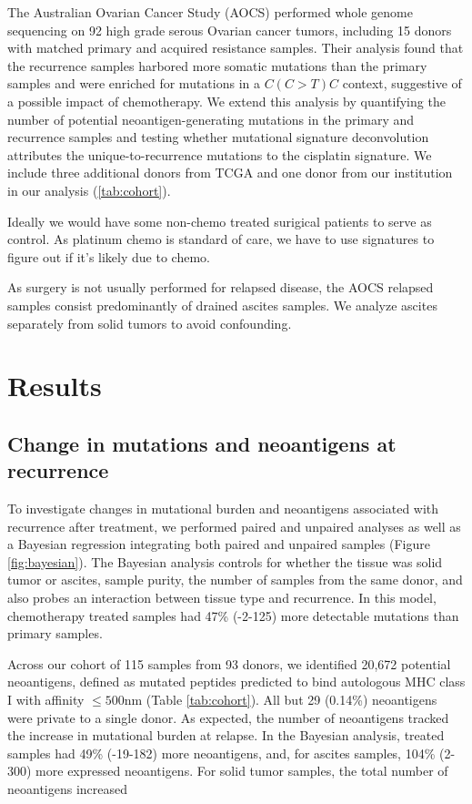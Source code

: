The Australian Ovarian Cancer Study (AOCS)\cite{Patch_2015} performed whole genome sequencing on 92 high grade serous Ovarian cancer tumors, including 15 donors with matched primary and acquired resistance samples. Their analysis found that the recurrence samples harbored more somatic mutations than the primary samples and were enriched for mutations in a $C(C \gt T)C$ context, suggestive of a possible impact of chemotherapy. We extend this analysis by quantifying the number of potential neoantigen-generating mutations in the primary and recurrence samples and testing whether mutational signature deconvolution attributes the unique-to-recurrence mutations to the  cisplatin signature. We include three additional donors from TCGA and one donor from our institution in our analysis (\ref{tab:cohort}).

Ideally we would have some non-chemo treated surigical patients to serve as control. As platinum chemo is standard of care, we have to use signatures to figure out if it's likely due to chemo.

As surgery is not usually performed for relapsed disease, the AOCS relapsed samples consist predominantly of drained ascites samples. We analyze ascites separately from solid tumors to avoid confounding.



\section*{Results}

\subsection*{Change in mutations and neoantigens at recurrence}
To investigate changes in mutational burden and neoantigens associated with recurrence after treatment, we performed paired and unpaired analyses as well as a Bayesian regression integrating both paired and unpaired samples (Figure \ref{fig:bayesian}). The Bayesian analysis controls for whether the tissue was solid tumor or ascites, sample purity, the number of samples from the same donor, and also probes an interaction between tissue type and recurrence. In this model, chemotherapy treated samples had 47\% (-2-125) more detectable mutations than primary samples.

Across our cohort of 115 samples from 93 donors, we identified 20,672 potential neoantigens, defined as mutated peptides predicted to bind autologous MHC class I with affinity $\leq 500$nm (Table \ref{tab:cohort}). All but 29 (0.14\%) neoantigens were private to a single donor. As expected, the number of neoantigens tracked the increase in mutational burden at relapse. In the Bayesian analysis, treated samples had 49\% (-19-182) more neoantigens, and, for ascites samples, 104\% (2-300) more expressed neoantigens. For solid tumor samples, the total number of neoantigens increased 



